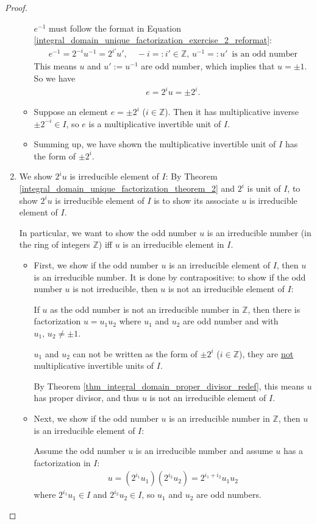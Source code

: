 \documentclass[utf8]{ctexbook}
\theoremstyle{definition}
\begin{document}
\begin{proof}
\begin{enumerate}
\begin{itemize}
{$e^{-1}$ must follow the format in Equation \ref{integral_domain_unique_factorization_exercise_2_reformat}:
\begin{align*}
e^{-1} = 2^{-i} u^{-1} = 2^{i'} u', \quad -i =: i' \in \mathbb{Z}, \, u^{-1} =: u' \, \mbox{ is an odd number}
\end{align*}
This means $u$ and $u' := u^{-1}$ are odd number, which implies that $u = \pm 1$. So we have
\begin{align*}
e = 2^i u = \pm 2^i .
\end{align*}
}
\item{Suppose an element $e = \pm 2^i$ ($i \in \mathbb{Z}$). Then it has multiplicative inverse $\pm 2^{-i} \in I$, so $e$ is a multiplicative invertible unit of $I$.
}
\item{Summing up, we have shown the multiplicative invertible unit of $I$ has the form of $\pm 2^{i}$.}
\end{itemize}
\item{We show $2^i u $ is irreducible element of $I$: By Theorem \ref{integral_domain_unique_factorization_theorem_2} and $2^i$ is unit of $I$, to show $2^i u $ is irreducible element of $I$ is to show its associate $u$ is irreducible element of $I$.

In particular, we want to show the odd number $u$ is an irreducible number (in the ring of integers $\mathbb{Z}$) iff $u$ is an irreducible element in $I$.}
\begin{itemize}
\item{First, we show if the odd number $u$ is an irreducible element of $I$, then $u$ is an irreducible number. It is done by contrapositive: to show if the odd number $u$ is not irreducible, then $u$ is not an irreducible element of $I$:

If $u$ as the odd number is not an irreducible number in $\mathbb{Z}$, then there is factorization $u = u_1 u_2$ where $u_1$ and $u_2$ are odd number and with $u_1, \, u_2 \neq \pm 1$.

$u_1$ and $u_2$ can not be written as the form of $\pm 2^i$ ($i \in \mathbb{Z}$), they are \underline{not} multiplicative invertible units of $I$.

By Theorem \ref{thm_integral_domain_proper_divisor_redef}, this means $u$ has proper divisor, and thus $u$ is not an irreducible element of $I$.}
\item{Next, we show if the odd number $u$ is an irreducible number in $\mathbb{Z}$, then $u$ is an irreducible element of $I$:

Assume the odd number $u$ is an irreducible number and assume $u $ has a factorization in $I$:
\begin{align*}
u = (2^{i_1}u_1 ) ( 2^{i_2} u_2 ) = 2^{i_1 + i_2} u_1 u_2
\end{align*}
where $2^{i_1}u_1 \in I$ and $2^{i_2} u_2 \in I$, so $u_1$ and $u_2$ are odd numbers.

}
\end{itemize}
\end{enumerate}
\end{proof}
\end{document}

